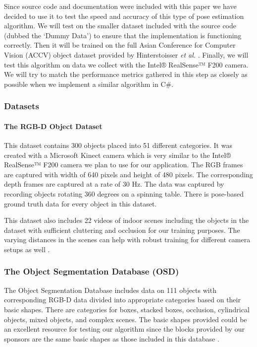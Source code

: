 \documentclass[12pt]{article}
\begin{document}
Since source code and documentation were included with this paper we
have decided to use it to test the speed and accuracy of this type of
pose estimation algorithm. We will test on the smaller dataset included
with the source code (dubbed the `Dummy Data') to ensure that the
implementation is functioning correctly. Then it will be trained on the
full Asian Conference for Computer Vision (ACCV) object dataset provided
by Hinterstoisser \emph{et al.} \autocite{hinterstoisser}. Finally, we
will test this algorithm on data we collect with the Intel® RealSense™
F200 camera. We will try to match the performance metrics gathered in
this step as closely as possible when we implement a similar algorithm
in C\#.

\subsubsection{Datasets}\label{datasets}

\paragraph{The RGB-D Object Dataset}\label{the-rgb-d-object-dataset}

This dataset contains 300 objects placed into 51 different categories.
It was created with a Microsoft Kinect camera which is very similar to
the Intel® RealSense™ F200 camera we plan to use for our application.
The RGB frames are captured with width of 640 pixels and height of 480
pixels. The corresponding depth frames are captured at a rate of 30 Hz.
The data was captured by recording objects rotating 360 degrees on a
spinning table. There is pose-based ground truth data for every object
in this dataset.

This dataset also includes 22 videos of indoor scenes including the
objects in the dataset with sufficient cluttering and occlusion for our
training purposes. The varying distances in the scenes can help with
robust training for different camera setups as well \autocite{rgbdObj}.

\subsubsection{The Object Segmentation Database
(OSD)}\label{the-object-segmentation-database-osd}

The Object Segmentation Database includes data on 111 objects with
corresponding RGB-D data divided into appropriate categories based on
their basic shapes. There are categories for boxes, stacked boxes,
occlusion, cylindrical objects, mixed objects, and complex scenes. The
basic shapes provided could be an excellent resource for testing our
algorithm since the blocks provided by our sponsors are the same basic
shapes as those included in this database \autocite{osd}.
\end{document}
